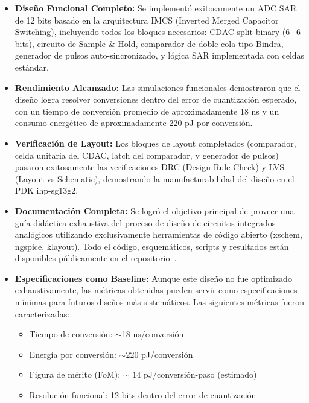 \documentclass[12pt,a4paper]{report}
\begin{document}
\begin{itemize}
    \item \textbf{Diseño Funcional Completo:} Se implementó exitosamente un ADC SAR de 12 bits basado en la arquitectura IMCS (Inverted Merged Capacitor Switching), incluyendo todos los bloques necesarios: CDAC split-binary (6+6 bits), circuito de Sample \& Hold, comparador de doble cola tipo Bindra, generador de pulsos auto-sincronizado, y lógica SAR implementada con celdas estándar.
    
    \item \textbf{Rendimiento Alcanzado:} Las simulaciones funcionales demostraron que el diseño logra resolver conversiones dentro del error de cuantización esperado, con un tiempo de conversión promedio de aproximadamente 18 ns y un consumo energético de aproximadamente 220 pJ por conversión.
    
    \item \textbf{Verificación de Layout:} Los bloques de layout completados (comparador, celda unitaria del CDAC, latch del comparador, y generador de pulsos) pasaron exitosamente las verificaciones DRC (Design Rule Check) y LVS (Layout vs Schematic), demostrando la manufacturabilidad del diseño en el PDK ihp-sg13g2.
    
    \item \textbf{Documentación Completa:} Se logró el objetivo principal de proveer una guía didáctica exhaustiva del proceso de diseño de circuitos integrados analógicos utilizando exclusivamente herramientas de código abierto (xschem, ngspice, klayout). Todo el código, esquemáticos, scripts y resultados están disponibles públicamente en el repositorio~\cite{repo_SAR}.
    
    \item \textbf{Especificaciones como Baseline:} Aunque este diseño no fue optimizado exhaustivamente, las métricas obtenidas pueden servir como especificaciones mínimas para futuros diseños más sistemáticos. Las siguientes métricas fueron caracterizadas:
    \begin{itemize}
        \item Tiempo de conversión: $\sim$18 ns/conversión
        \item Energía por conversión: $\sim$220 pJ/conversión
        \item Figura de mérito (FoM): $\sim$ $14$ pJ/conversión-paso (estimado)
        \item Resolución funcional: 12 bits dentro del error de cuantización
    \end{itemize}
\end{itemize}
\end{document}
